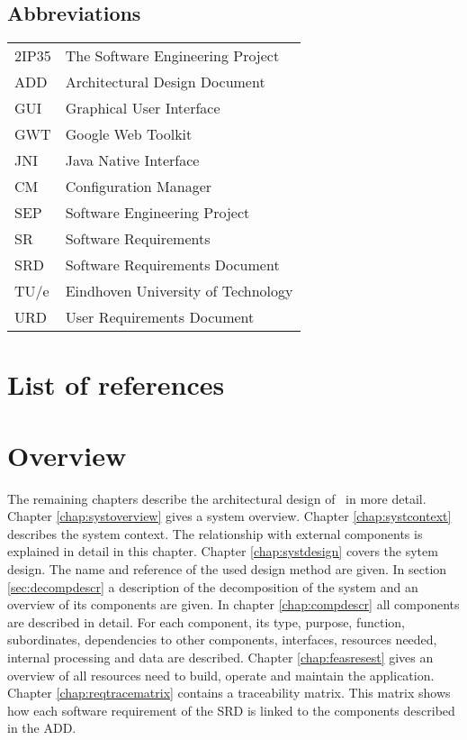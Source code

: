 \subsection{Abbreviations}
\begin{tabular}{l|l}
2IP35 & The Software Engineering Project \\
ADD & Architectural Design Document \\
GUI & Graphical User Interface \\
GWT & Google Web Toolkit \\
JNI & Java Native Interface \\
CM    & Configuration Manager \\
SEP   & Software Engineering Project \\
SR    & Software Requirements \\
SRD   & Software Requirements Document \\
TU/e  & Eindhoven University of Technology \\
URD   & User Requirements Document \\
\end{tabular}

\section{List of references}


\section{Overview}
The remaining chapters describe the architectural design of \projectname\ in more detail. Chapter \ref{chap:systoverview} gives a system overview. Chapter \ref{chap:systcontext} describes the system context. The relationship with external components is explained in detail in this chapter. Chapter \ref{chap:systdesign} covers the sytem design. The name and reference of the used design method are given. In section \ref{sec:decompdescr} a description of the decomposition of the system and an overview of its components are given.
In chapter \ref{chap:compdescr} all components are described in detail. For each component, its type, purpose, function, subordinates, dependencies to other components, interfaces, resources needed, internal processing and  data are described. Chapter \ref{chap:feasresest} gives an overview of all resources need to build, operate and maintain the application. Chapter \ref{chap:reqtracematrix} contains a traceability matrix. This matrix shows how each software requirement of the SRD \cite{srd} is linked to the components described in the ADD.


